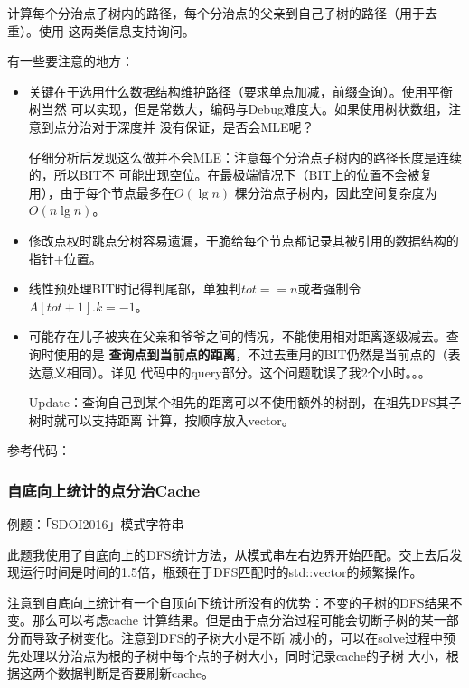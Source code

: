 计算每个分治点子树内的路径，每个分治点的父亲到自己子树的路径（用于去重）。使用
这两类信息支持询问。

有一些要注意的地方：
\begin{itemize}
    \item 关键在于选用什么数据结构维护路径（要求单点加减，前缀查询）。使用平衡树当然
    可以实现，但是常数大，编码与Debug难度大。如果使用树状数组，注意到点分治对于深度并
    没有保证，是否会MLE呢？

    仔细分析后发现这么做并不会MLE：注意每个分治点子树内的路径长度是连续的，所以BIT不
    可能出现空位。在最极端情况下（BIT上的位置不会被复用），由于每个节点最多在$O(\lg n)$
    棵分治点子树内，因此空间复杂度为$O(n\lg n)$。
    \item 修改点权时跳点分树容易遗漏，干脆给每个节点都记录其被引用的数据结构的指针+位置。
    \item 线性预处理BIT时记得判尾部，单独判$tot==n$或者强制令$A[tot+1].k=-1$。
    \item 可能存在儿子被夹在父亲和爷爷之间的情况，不能使用相对距离逐级减去。查询时使用的是
    {\bfseries 查询点到当前点的距离}，不过去重用的BIT仍然是当前点的（表达意义相同）。详见
    代码中的query部分。这个问题耽误了我2个小时。。。

    Update：查询自己到某个祖先的距离可以不使用额外的树剖，在祖先DFS其子树时就可以支持距离
    计算，按顺序放入vector。
\end{itemize}

参考代码：


\subsubsection{自底向上统计的点分治Cache}
例题：「SDOI2016」模式字符串

此题我使用了自底向上的DFS统计方法，从模式串左右边界开始匹配。交上去后发现运行时间是时间的1.5倍，瓶颈在于DFS匹配时的std::vector的频繁操作。

注意到自底向上统计有一个自顶向下统计所没有的优势：不变的子树的DFS结果不变。那么可以考虑cache
计算结果。但是由于点分治过程可能会切断子树的某一部分而导致子树变化。注意到DFS的子树大小是不断
减小的，可以在solve过程中预先处理以分治点为根的子树中每个点的子树大小，同时记录cache的子树
大小，根据这两个数据判断是否要刷新cache。
